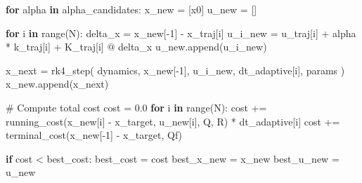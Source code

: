\documentclass[
  letterpaper,
  DIV=11,
  numbers=noendperiod]{scrartcl}
\newenvironment{Shaded}{\begin{snugshade}}{\end{snugshade}}
\newcommand{\BuiltInTok}[1]{\textcolor[rgb]{0.00,0.23,0.31}{#1}}
\newcommand{\CommentTok}[1]{\textcolor[rgb]{0.37,0.37,0.37}{#1}}
\newcommand{\ControlFlowTok}[1]{\textcolor[rgb]{0.00,0.23,0.31}{\textbf{#1}}}
\newcommand{\DecValTok}[1]{\textcolor[rgb]{0.68,0.00,0.00}{#1}}
\newcommand{\FloatTok}[1]{\textcolor[rgb]{0.68,0.00,0.00}{#1}}
\newcommand{\KeywordTok}[1]{\textcolor[rgb]{0.00,0.23,0.31}{\textbf{#1}}}
\newcommand{\NormalTok}[1]{\textcolor[rgb]{0.00,0.23,0.31}{#1}}
\newcommand{\OperatorTok}[1]{\textcolor[rgb]{0.37,0.37,0.37}{#1}}
\begin{document}
\begin{Shaded}
\begin{Highlighting}[]
        \ControlFlowTok{for}\NormalTok{ alpha }\KeywordTok{in}\NormalTok{ alpha\_candidates:}
\NormalTok{            x\_new }\OperatorTok{=}\NormalTok{ [x0]}
\NormalTok{            u\_new }\OperatorTok{=}\NormalTok{ []}

            \ControlFlowTok{for}\NormalTok{ i }\KeywordTok{in} \BuiltInTok{range}\NormalTok{(N):}
\NormalTok{                delta\_x }\OperatorTok{=}\NormalTok{ x\_new[}\OperatorTok{{-}}\DecValTok{1}\NormalTok{] }\OperatorTok{{-}}\NormalTok{ x\_traj[i]}
\NormalTok{                u\_i\_new }\OperatorTok{=}\NormalTok{ u\_traj[i] }\OperatorTok{+}\NormalTok{ alpha }\OperatorTok{*}\NormalTok{ k\_traj[i] }\OperatorTok{+}\NormalTok{ K\_traj[i] }\OperatorTok{@}\NormalTok{ delta\_x}
\NormalTok{                u\_new.append(u\_i\_new)}

\NormalTok{                x\_next }\OperatorTok{=}\NormalTok{ rk4\_step(}
\NormalTok{                    dynamics, x\_new[}\OperatorTok{{-}}\DecValTok{1}\NormalTok{], u\_i\_new, dt\_adaptive[i], params}
\NormalTok{                )}
\NormalTok{                x\_new.append(x\_next)}

            \CommentTok{\# Compute total cost}
\NormalTok{            cost }\OperatorTok{=} \FloatTok{0.0}
            \ControlFlowTok{for}\NormalTok{ i }\KeywordTok{in} \BuiltInTok{range}\NormalTok{(N):}
\NormalTok{                cost }\OperatorTok{+=}\NormalTok{ running\_cost(x\_new[i] }\OperatorTok{{-}}\NormalTok{ x\_target, u\_new[i], Q, R) }\OperatorTok{*}\NormalTok{ dt\_adaptive[i]}
\NormalTok{            cost }\OperatorTok{+=}\NormalTok{ terminal\_cost(x\_new[}\OperatorTok{{-}}\DecValTok{1}\NormalTok{] }\OperatorTok{{-}}\NormalTok{ x\_target, Qf)}

            \ControlFlowTok{if}\NormalTok{ cost }\OperatorTok{\textless{}}\NormalTok{ best\_cost:}
\NormalTok{                best\_cost }\OperatorTok{=}\NormalTok{ cost}
\NormalTok{                best\_x\_new }\OperatorTok{=}\NormalTok{ x\_new}
\NormalTok{                best\_u\_new }\OperatorTok{=}\NormalTok{ u\_new}


\end{Highlighting}
\end{Shaded}
\end{document}

